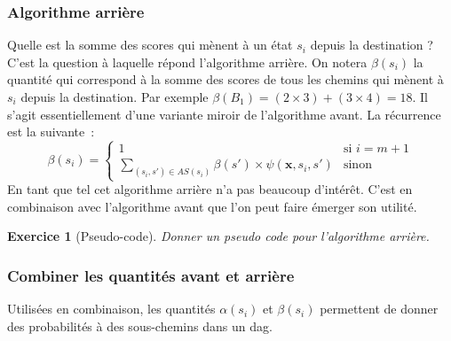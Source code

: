 \documentclass[11pt,openany]{book}
\newtheorem{exo}{Exercice}[chapter]
\newcommand{\ac}[1]{{\sc #1}} %
\begin{document}
\subsubsection{Algorithme arrière} Quelle est la somme des scores qui mènent à un état $s_i$ depuis la destination ?
C'est la question à laquelle répond l'algorithme arrière.
On notera $\beta(s_i)$ la quantité qui correspond à la somme des scores de tous les chemins qui mènent à $s_i$ depuis la destination. Par exemple $\beta(B_1) = (2\times 3) + (3\times 4) = 18$. Il s'agit essentiellement d'une variante miroir de l'algorithme avant. La récurrence est la suivante~:
\begin{equation}
\label{eq-backward}
\beta(s_i) = \left\{ 
\begin{array}{ll}
1 & \text{si }  i = m+1\\
\sum_{(s_i,s')\in AS(s_i)}  \beta(s') \times \psi(\mathbf{x},s_i,s')&\text{sinon}
\end{array}
\right.
\end{equation}
En tant que tel cet algorithme arrière n'a pas beaucoup d'intérêt. C'est en combinaison avec l'algorithme avant que l'on peut faire émerger son utilité.

\begin{exo}[Pseudo-code]
Donner un pseudo code pour l'algorithme arrière.
\end{exo}

\subsubsection{Combiner les quantités avant et arrière}
Utilisées en combinaison, les quantités $\alpha(s_i)$ et $\beta(s_i)$ permettent de donner des probabilités à des sous-chemins dans un \ac{dag}.
\end{document}
